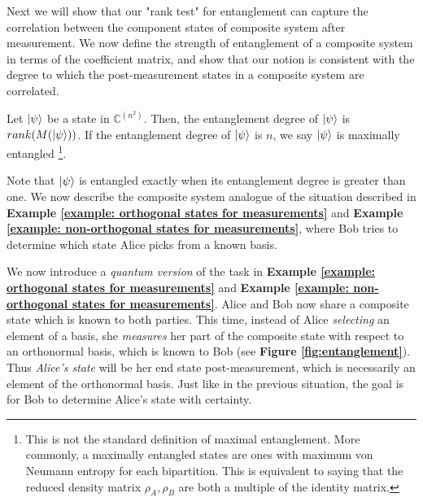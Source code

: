 Next we will show that our "rank test" for entanglement can capture the correlation between the component states of composite system after measurement.  We now define the strength of entanglement of a composite system in terms of the coefficient matrix, and show that our notion is consistent with the degree to which the post-measurement states in a composite system are correlated.

\begin{definition} \label{def: maximally entangled}
 Let $\ket{\psi}$ be a state in ${\mathbb{C}}^{(n^2)}$.  Then, the entanglement degree of $\ket{\psi}$ is $rank(M(\ket{\psi}))$.  If the entanglement degree of $\ket{\psi}$ is $n$, we say $\ket{\psi}$ is maximally entangled \footnote{This is not the standard definition of maximal entanglement.  More commonly, a maximally entangled states are ones with maximum von Neumann entropy for each bipartition. This is equivalent to saying that the reduced density matrix $\rho_A, \rho_B$ are both a multiple of the identity matrix.}.
\end{definition}


Note that $\ket{\psi}$ is entangled exactly when its entanglement degree is greater than one.  We now describe the composite system analogue of the situation described in \textbf{Example \ref{example: orthogonal states for measurements}} and \textbf{Example \ref{example: non-orthogonal states for measurements}}, where Bob tries to determine which state Alice picks from a known basis. 

We now introduce a {\emph{quantum version}} of the task in \textbf{Example \ref{example: orthogonal states for measurements}} and \textbf{Example \ref{example: non-orthogonal states for measurements}}. Alice and Bob now share a composite state which is known to both parties.  This time, instead of Alice {\emph{selecting}} an element of a basis, she {\emph{measures}} her part of the composite state with respect to an orthonormal basis, which is known to Bob (see \textbf{Figure \ref{fig:entanglement}}).  Thus {\emph{Alice's state}} will be her end state post-measurement, which is necessarily an element of the orthonormal basis.  Just like in the previous situation, the goal is for Bob to determine Alice's state with certainty.  


